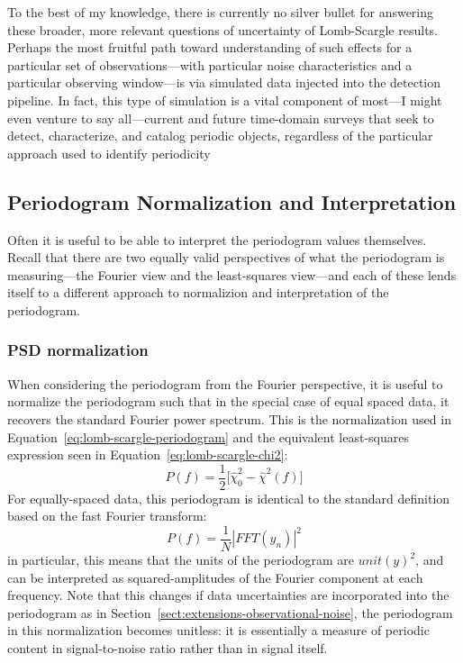 \documentclass[preprint]{aastex}
\newcommand{\Eq}[1]{Equation~\ref{eq:#1}}
\newcommand{\eq}[1]{\Eq{#1}}
\newcommand{\eqlabel}[1]{\label{eq:#1}}
\newcommand{\Sect}[1]{Section~\ref{sect:#1}}
\newcommand{\sect}[1]{\Sect{#1}}
\newcommand{\sectlabel}[1]{\label{sect:#1}}
\begin{document}
To the best of my knowledge, there is currently no silver bullet for answering
these broader, more relevant questions of uncertainty of Lomb-Scargle results.
Perhaps the most fruitful path toward understanding of such effects for a
particular set of observations---with particular noise characteristics and a
particular observing window---is via simulated data injected into the detection
pipeline.
In fact, this type of simulation is a vital component of most---I might even
venture to say all---current and future time-domain surveys that seek to
detect, characterize, and catalog periodic objects,
regardless of the particular approach used to identify periodicity
\citep[see, e.g.][etc.]{opsim1, opsim2, Ivezic08LSST, Sesar2010,
  Oluseyi12, McQuillan2012, Drake2014}



\subsection{Periodogram Normalization and Interpretation}
\sectlabel{normalizations}

Often it is useful to be able to interpret the periodogram values themselves.
Recall that there are two equally valid perspectives of what the periodogram
is measuring---the Fourier view and the least-squares view---and each of these
lends itself to a different approach to normalizion and interpretation of the
periodogram.

\subsubsection{PSD normalization}
When considering the periodogram from the Fourier perspective,
it is useful to normalize the periodogram such that in the special case
of equal spaced data, it recovers the standard Fourier power spectrum.
This is the normalization used in \eq{lomb-scargle-periodogram} and the
equivalent least-squares expression seen in \eq{lomb-scargle-chi2}:
\begin{equation}
  P(f) = \frac{1}{2}\big[\hat{\chi}^2_0 - \hat{\chi}^2(f)\big]
  \eqlabel{lomb-scargle-chi2-2}
\end{equation}
For equally-spaced data, this periodogram is identical to the standard
definition based on the fast Fourier transform:
\begin{equation}
  P(f) = \frac{1}{N} \left| FFT(y_n) \right|^2
\end{equation}
in particular, this means that the units of the periodogram are $unit(y)^2$,
and can be interpreted as squared-amplitudes of the Fourier component at
each frequency.
Note that this changes if data uncertainties are incorporated into
the periodogram as in \sect{extensions-observational-noise},
the periodogram in this normalization becomes unitless: it is essentially
a measure of periodic content in signal-to-noise ratio
rather than in signal itself.
\end{document}
